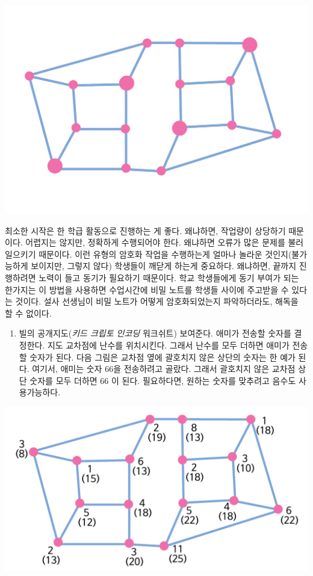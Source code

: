 \documentclass[]{article}
\begin{document}
\includegraphics{csunplugged/05-part/img/ch19-public-key/18-public-key-02-kid-worksheet.png}

최소한 시작은 한 학급 활동으로 진행하는 게 좋다. 왜냐하면, 작업량이
상당하기 때문이다. 어렵지는 않지만, 정확하게 수행되어야 한다. 왜냐하면
오류가 많은 문제를 불러 일으키기 때문이다. 이런 유형의 암호화 작업을
수행하는게 얼마나 놀라운 것인지(불가능하게 보이지만, 그렇지 않다)
학생들이 깨닫게 하는게 중요하다. 왜냐하면, 끝까지 진행하려면 노력이 들고
동기가 필요하기 때문이다. 학교 학생들에게 동기 부여가 되는 한가지는 이
방법을 사용하면 수업시간에 비밀 노트를 학생들 사이에 주고받을 수 있다는
것이다. 설사 선생님이 비밀 노트가 어떻게 암호화되었는지 파악하더라도,
해독을 할 수 없이다.

\begin{enumerate}
\itemsep1pt\parskip0pt
\item
  빌의 공개지도(\emph{키드 크립토 인코딩} 워크쉬트) 보여준다. 애미가
  전송할 숫자를 결정한다. 지도 교차점에 난수를 위치시킨다. 그래서 난수를
  모두 더하면 애미가 전송할 숫자가 된다. 다음 그림은 교차점 옆에
  괄호치지 않은 상단의 숫자는 한 예가 된다. 여기서, 애미는 숫자 66을
  전송하려고 골랐다. 그래서 괄호치지 않은 교차점 상단 숫자를 모두 더하면
  66 이 된다. 필요하다면, 원하는 숫자를 맞추려고 음수도 사용가능하다.
\end{enumerate}

\includegraphics{csunplugged/05-part/img/ch19-public-key/18-public-key-03-public-map.png}
\end{document}
